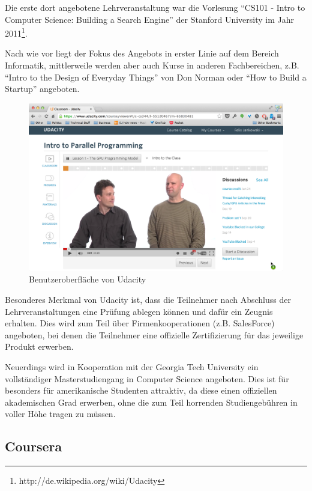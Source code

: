 			Die erste dort angebotene Lehrveranstaltung war die Vorlesung "`CS101 - Intro to Computer Science: Building a Search Engine"' der Stanford University im Jahr 2011\footnote{http://de.wikipedia.org/wiki/Udacity}.

			Nach wie vor liegt der Fokus des Angebots in erster Linie auf dem Bereich Informatik, mittlerweile werden aber auch Kurse in anderen Fachbereichen, z.B. "`Intro to the Design of Everyday Things"' von Don Norman oder "`How to Build a Startup"' angeboten.


			\begin{figure}[h]
				\begin{center}
					\includegraphics[width=\textwidth]{img/udacity}
					\caption{Benutzeroberfläche von Udacity}
					\label{fig:screenshot-udacity}
				\end{center}
			\end{figure}

			Besonderes Merkmal von Udacity ist, dass die Teilnehmer nach Abschluss der Lehrveranstaltungen eine Prüfung ablegen können und dafür ein Zeugnis erhalten.
			Dies wird zum Teil über Firmenkooperationen (z.B. SalesForce) angeboten, bei denen die Teilnehmer eine offizielle Zertifizierung für das jeweilige Produkt erwerben.

			Neuerdings wird in Kooperation mit der Georgia Tech University ein vollständiger Masterstudiengang in Computer Science angeboten.
			Dies ist für besonders für amerikanische Studenten attraktiv, da diese einen offiziellen akademischen Grad erwerben, ohne die zum Teil horrenden Studiengebühren in voller Höhe tragen zu müssen.

		\subsection{Coursera}

